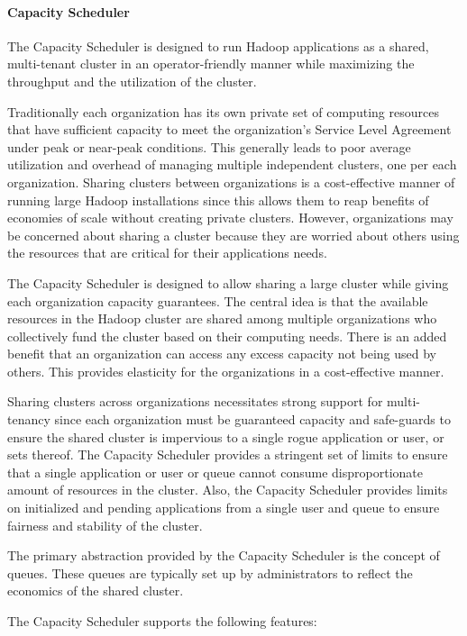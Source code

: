 \paragraph{Capacity Scheduler}

The Capacity Scheduler is designed to run Hadoop applications as a shared, multi-tenant cluster in an operator-friendly manner while maximizing the throughput and the utilization of the cluster.

Traditionally each organization has its own private set of computing resources that have sufficient capacity to meet the organization’s Service Level Agreement under peak or near-peak conditions. This generally leads to poor average utilization and overhead of managing multiple independent clusters, one per each organization. Sharing clusters between organizations is a cost-effective manner of running large Hadoop installations since this allows them to reap benefits of economies of scale without creating private clusters. However, organizations may be concerned about sharing a cluster because they are worried about others using the resources that are critical for their applications needs.

The Capacity Scheduler is designed to allow sharing a large cluster while giving each organization capacity guarantees. The central idea is that the available resources in the Hadoop cluster are shared among multiple organizations who collectively fund the cluster based on their computing needs. There is an added benefit that an organization can access any excess capacity not being used by others. This provides elasticity for the organizations in a cost-effective manner.

Sharing clusters across organizations necessitates strong support for multi-tenancy since each organization must be guaranteed capacity and safe-guards to ensure the shared cluster is impervious to a single rogue application or user, or sets thereof. The Capacity Scheduler provides a stringent set of limits to ensure that a single application or user or queue cannot consume disproportionate amount of resources in the cluster. Also, the Capacity Scheduler provides limits on initialized and pending applications from a single user and queue to ensure fairness and stability of the cluster.

The primary abstraction provided by the Capacity Scheduler is the concept of queues. These queues are typically set up by administrators to reflect the economics of the shared cluster.

The Capacity Scheduler supports the following features:

